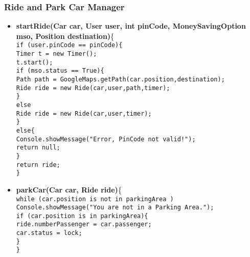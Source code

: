 \subsubsection{Ride and Park Car Manager}
\begin{itemize}
\item \textbf{startRide(Car car, User user, int pinCode, MoneySavingOption mso, Position destination)}\{\\
\texttt{if (user.pinCode == pinCode)\{\\
\tab Timer t = new Timer(); \\ 
\tab t.start();\\
\tab if (mso.status == True)\{\\
\tab \tab Path path = GoogleMaps.getPath(car.position,destination);\\
\tab \tab Ride ride = new Ride(car,user,path,timer);\\
\tab \tab \}\\
\tab else\\
\tab \tab Ride ride = new Ride(car,user,timer);\\
\tab \}\\
else\{\\
\tab Console.showMessage("Error, PinCode not valid!");\\
\tab return null;\\
\tab \}\\
return ride;\\
\}\\
}

\item \textbf{parkCar(Car car, Ride ride)}\{\\
\texttt{while (car.position is not in parkingArea )\\ 
\tab Console.showMessage("You are not in a Parking Area.");\\
if (car.position is in parkingArea)\{\\
\tab ride.numberPassenger = car.passenger;\\
\tab car.status = lock;\\
\tab\}\\
\}
 }
 

\end{itemize}
